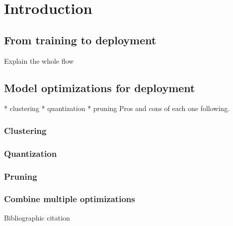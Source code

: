 \chapter{Introduction}
\lipsum[1]

\section{From training to deployment}
Explain the whole flow
\lipsum[1]

\section{Model optimizations for deployment}
* clustering
* quantization
* pruning
Pros and cons of each one following.
\lipsum[1]

\subsection{Clustering}
\lipsum[1]

\subsection{Quantization}
\lipsum[1]

\subsection{Pruning}
\lipsum[1]

\subsection{Combine multiple optimizations}
\lipsum[1]

Bibliographic citation\cite{ec2web}
